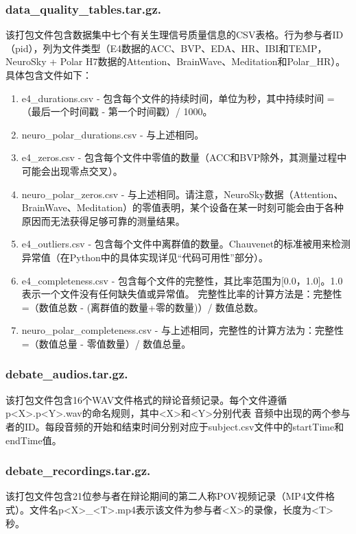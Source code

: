 \subsubsection{data\_quality\_tables.tar.gz.}
该打包文件包含数据集中七个有关生理信号质量信息的CSV表格。行为参与者ID（pid），列为文件类型（E4数据的ACC、BVP、EDA、HR、IBI和TEMP，NeuroSky + Polar 
H7数据的Attention、BrainWave、Meditation和Polar\_HR）。具体包含文件如下：
\begin{enumerate}
    \item e4\_durations.csv - 包含每个文件的持续时间，单位为秒，其中持续时间 =（最后一个时间戳 - 第一个时间戳）/ 1000。
    \item neuro\_polar\_durations.csv - 与上述相同。
    \item e4\_zeros.csv - 包含每个文件中零值的数量（ACC和BVP除外，其测量过程中可能会出现零点交叉）。
    \item neuro\_polar\_zeros.csv - 与上述相同。请注意，NeuroSky数据（Attention、BrainWave、Meditation）的零值表明，某个设备在某一时刻可能会由于各种原因而无法获得足够可靠的测量结果。
    \item e4\_outliers.csv - 包含每个文件中离群值的数量。Chauvenet的标准被用来检测异常值（在Python中的具体实现详见“代码可用性”部分）。
    \item e4\_completeness.csv - 包含每个文件的完整性，其比率范围为[0.0，1.0]。1.0表示一个文件没有任何缺失值或异常值。
    完整性比率的计算方法是：完整性 =（数值总数 - (离群值的数量+零的数量)）/ 数值总数。
    \item neuro\_polar\_completeness.csv - 与上述相同，完整性的计算方法为：完整性 =（数值总量 - 零值数量）/ 数值总量。
\end{enumerate}

\subsubsection{debate\_audios.tar.gz.}
该打包文件包含16个WAV文件格式的辩论音频记录。每个文件遵循p<X>.p<Y>.wav的命名规则，其中<X>和<Y>分别代表
音频中出现的两个参与者的ID。每段音频的开始和结束时间分别对应于subject.csv文件中的startTime和endTime值。 

\subsubsection{debate\_recordings.tar.gz.}
该打包文件包含21位参与者在辩论期间的第二人称POV视频记录（MP4文件格式）。文件名p<X>\_<T>.mp4表示该文件为参与者<X>的录像，长度为<T>秒。

